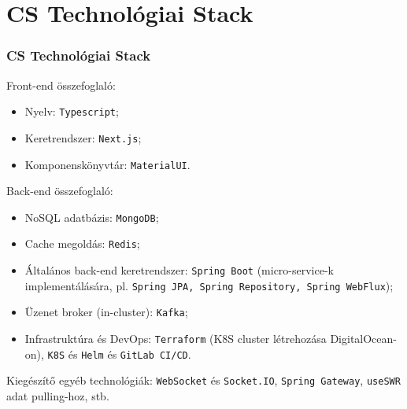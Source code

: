 \section{CS Technológiai Stack}

\begin{frame}
    \frametitle{CS Technológiai Stack}

    Front-end összefoglaló:
    \begin{itemize}
        \item Nyelv: \texttt{Typescript};
        \item Keretrendszer: \texttt{Next.js};
        \item Komponenskönyvtár: \texttt{MaterialUI}.
    \end{itemize}

    \medbreak

    Back-end összefoglaló:
    \begin{itemize}
        \item NoSQL adatbázis: \texttt{MongoDB};
        \item Cache megoldás: \texttt{Redis};
        \item Általános back-end keretrendszer: \texttt{Spring Boot} (micro-service-k implementálására, pl. \texttt{Spring JPA, Spring Repository, Spring WebFlux});
        \item Üzenet broker (in-cluster): \texttt{Kafka};
        \item Infrastruktúra és DevOps: \texttt{Terraform} (K8S cluster létrehozása DigitalOcean-on), \texttt{K8S} és \texttt{Helm} és \texttt{GitLab CI/CD}.
    \end{itemize}

    \medbreak

    Kiegészítő egyéb technológiák: \texttt{WebSocket} és \texttt{Socket.IO}, \texttt{Spring Gateway}, \texttt{useSWR} adat pulling-hoz, stb.

\end{frame}
